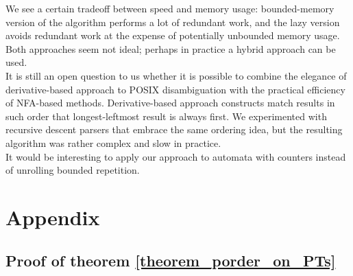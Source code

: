 \documentclass[AMA,STIX1COL]{WileyNJD-v2}
\begin{document}
We see a certain tradeoff between speed and memory usage:
bounded-memory version of the algorithm performs a lot of redundant work,
and the lazy version avoids redundant work at the expense of potentially unbounded memory usage.
Both approaches seem not ideal;
perhaps in practice a hybrid approach can be used.
\\

It is still an open question to us
whether it is possible to combine the elegance of derivative-based approach to POSIX disambiguation
with the practical efficiency of NFA-based methods.
%
Derivative-based approach constructs match results in such order that longest-leftmost result is always first.
%
We experimented with recursive descent parsers that embrace the same ordering idea,
but the resulting algorithm was rather complex and slow in practice.
\\

It would be interesting to apply our approach to automata with counters
instead of unrolling bounded repetition.


\vfill\null
\clearpage


\section*{Appendix}

\subsection*{Proof of theorem \ref{theorem_porder_on_PTs}}
\end{document}
